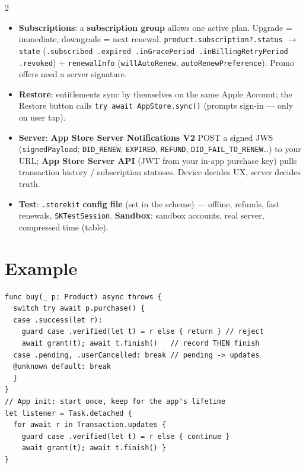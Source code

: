 \documentclass[8pt]{extarticle}
\begin{document}
\begin{multicols}{2}
\begin{itemize}
  \item \textbf{Subscriptions}: a \textbf{subscription group} allows one
        active plan. Upgrade = immediate, downgrade = next renewal.
        \texttt{product.subscription?.status} $\to$ \texttt{state}
        (\texttt{.subscribed .expired .inGracePeriod .inBillingRetryPeriod
        .revoked}) + \texttt{renewalInfo} (\texttt{willAutoRenew},
        \texttt{autoRenewPreference}). Promo offers need a server signature.
  \item \textbf{Restore}: entitlements sync by themselves on the same Apple
        Account; the Restore button calls \texttt{try await AppStore.sync()}
        (prompts sign-in — only on user tap).
  \item \textbf{Server}: \textbf{App Store Server Notifications V2} POST a
        signed JWS (\texttt{signedPayload}; \texttt{DID\_RENEW},
        \texttt{EXPIRED}, \texttt{REFUND}, \texttt{DID\_FAIL\_TO\_RENEW}\ldots)
        to your URL; \textbf{App Store Server API} (JWT from your in-app
        purchase key) pulls transaction history / subscription statuses.
        Device decides UX, server decides truth.
  \item \textbf{Test}: \texttt{.storekit} \textbf{config file} (set in the
        scheme) — offline, refunds, fast renewals, \texttt{SKTestSession}.
        \textbf{Sandbox}: sandbox accounts, real server, compressed time (table).
\end{itemize}

\section{Example}
\begin{lstlisting}[language=SwiftSheet]
func buy(_ p: Product) async throws {
  switch try await p.purchase() {
  case .success(let r):
    guard case .verified(let t) = r else { return } // reject
    await grant(t); await t.finish()   // record THEN finish
  case .pending, .userCancelled: break // pending -> updates
  @unknown default: break
  }
}
// App init: start once, keep for the app's lifetime
let listener = Task.detached {
  for await r in Transaction.updates {
    guard case .verified(let t) = r else { continue }
    await grant(t); await t.finish() }
}
\end{lstlisting}

\columnbreak


\end{multicols}
\end{document}
